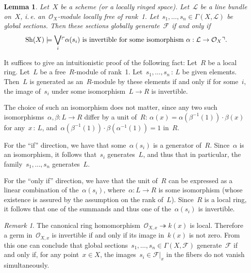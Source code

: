 \documentclass[10pt,reqno,a4paper]{amsbook}
\makeatletter
\theoremstyle{definition}
\theoremstyle{plain}
\newtheorem{lemma}[defn]{Lemma}
\theoremstyle{remark}
\newtheorem{rem}[defn]{Remark}
\newcommand{\F}{\mathcal{F}}
\renewcommand{\O}{\mathcal{O}}
\renewcommand{\L}{\mathcal{L}}
\newcommand{\Sh}{\mathrm{Sh}}
\newcommand{\?}{\,{:}\,}
\renewcommand{\_}{\mathpunct{.}\,}
\newcommand{\speak}[1]{\ulcorner\text{\textnormal{#1}}\urcorner}
\newcommand{\ie}{i.\,e.\@\xspace}
\renewenvironment{proof}[1][\proofname]{\par
  \pushQED{\qed}%
  \normalfont \topsep6\p@\@plus6\p@\relax
  \trivlist
  \item[\hskip\labelsep
        \itshape
    #1\@addpunct{.}]\ignorespaces
}{%
  \popQED\endtrivlist\@endpefalse
}
\makeatother
\begin{document}
\begin{lemma}Let~$X$ be a scheme (or a locally ringed space). Let~$\L$ be a line
bundle on~$X$, \ie an~$\O_X$-module locally free of rank~1.
Let~$s_1,\ldots,s_n \in \Gamma(X,\L)$ be global sections. Then these sections
globally generate~$\F$ if and only if
\[ \Sh(X) \models \bigvee_i \speak{$\alpha(s_i)$ is invertible for some
isomorphism~$\alpha : \L \to \O_X$}. \]
\end{lemma}
\begin{proof}It suffices to give an intuitionistic proof of the following fact:
Let~$R$ be a local ring. Let~$L$ be a free~$R$-module of rank~1.
Let~$s_1,\ldots,s_n\?L$ be given elements. Then~$L$ is generated as
an~$R$-module by these elements if and only if for some~$i$, the image of~$s_i$
under some isomorphism~$L \to R$ is invertible.

The choice of such an isomorphism does not matter, since any two such
isomorphisms~$\alpha, \beta : L \to R$ differ by a unit of~$R$: $\alpha(x) =
\alpha(\beta^{-1}(1)) \cdot \beta(x)$ for any~$x\?L$,
and~$\alpha(\beta^{-1}(1)) \cdot \beta(\alpha^{-1}(1)) = 1$ in~$R$.

For the ``if'' direction, we have that some~$\alpha(s_i)$ is a generator
of~$R$. Since~$\alpha$ is an isomorphism, it follows that~$s_i$ generates~$L$,
and thus that in particular, the family~$s_1,\ldots,s_n$ generates~$L$.

For the ``only if'' direction, we have that the unit of~$R$ can be expressed as
a linear combination of the~$\alpha(s_i)$, where~$\alpha : L \to R$ is some
isomorphism (whose existence is assured by the assumption on the rank of~$L$).
Since~$R$ is a local ring, it follows that one of the summands and thus one of
the~$\alpha(s_i)$ is invertible.
\end{proof}

\begin{rem}The canonical ring homomorphism~$\O_{X,x}
\twoheadrightarrow k(x)$ is local. Therefore a germ in~$\O_{X,x}$ is invertible
if and only if its image in~$k(x)$ is not zero. From this one can conclude that
global sections~$s_1,\ldots,s_n \in \Gamma(X,\F)$ generate~$\F$ if and only if,
for any point~$x \in X$, the images~$s_i \in \F|_x$ in the fibers do not vanish
simultaneously.
\end{rem}
\end{document}
